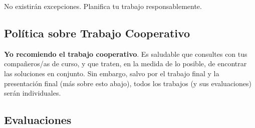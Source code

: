 \documentclass[letterpaper]{article}
\renewenvironment{itemize}{
  \begin{list}{}{
    \setlength{\leftmargin}{1.5em}
  }
}{
  \end{list}
}
\begin{document}
\begin{itemize}
\item[{\color{red}\Pointinghand}] No existir\'an excepciones. Planifica tu trabajo responsablemente. 
\end{itemize}

\subsection*{Pol\'itica sobre Trabajo Cooperativo}

{\bf Yo recomiendo el trabajo cooperativo}. Es saludable que consultes con tus compa\~neros/as de curso, y que traten, en la medida de lo posible, de encontrar las soluciones en conjunto. Sin embargo, salvo por el trabajo final y la presentaci\'on final (m\'as sobre esto abajo), todos los trabajos (y sus evaluaciones) ser\'an individuales.


\subsection*{Evaluaciones}
\end{document}
